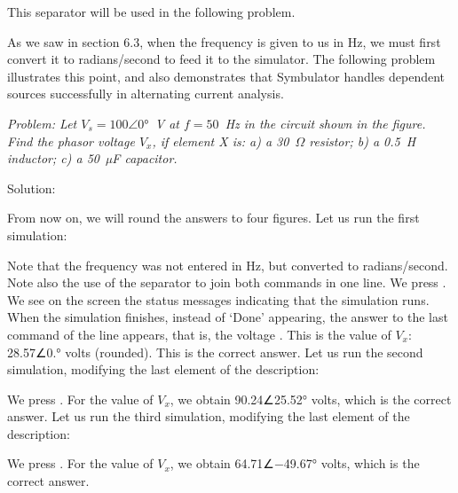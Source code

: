This separator will be used in the following problem.

As we saw in section 6.3, when the frequency is given to us in Hz,
we must first convert it to radians/second to feed it to the
simulator. The following problem illustrates this point, and also
demonstrates that Symbulator handles dependent sources successfully
in alternating current analysis.


\emph{Problem: Let $V_s = 100∠0°$~V at $f = 50$~Hz in the circuit
shown in the figure. Find the phasor voltage $V_x$, if element X is:
a) a 30~$\Omega$ resistor; b) a 0.5~H inductor; c) a 50~µF
capacitor.}

Solution:

From now on, we will round the answers to four figures. Let us run
the first simulation:


Note that the frequency was not entered in Hz, but converted to
radians/second. Note also the use of the separator \code{:} to join
both commands in one line. We press . We see on the
screen the status messages indicating that the simulation runs. When
the simulation finishes, instead of `Done' appearing, the answer to
the last command of the line appears, that is, the voltage
. This is the value of $V_x$: 28.57∠0.° volts (rounded).
This is the correct answer. Let us run the second simulation,
modifying the last element of the description:


We press . For the value of $V_x$, we obtain
90.24∠25.52° volts, which is the correct answer. Let us run the
third simulation, modifying the last element of the description:


We press . For the value of $V_x$, we obtain
64.71∠$-$49.67° volts, which is the correct answer.

